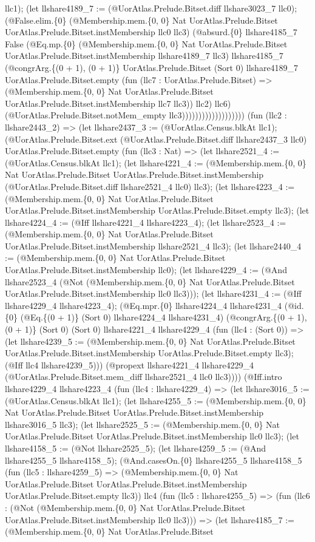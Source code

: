 \documentclass[11pt]{article}
\begin{document}
llc1); (let llshare4189\_7 := (@UorAtlas.Prelude.Bitset.diff llshare3023\_7 llc0); (@False.elim.\{0\} (@Membership.mem.\{0, 0\} Nat UorAtlas.Prelude.Bitset UorAtlas.Prelude.Bitset.instMembership llc0 llc3) (@absurd.\{0\} llshare4185\_7 False (@Eq.mp.\{0\} (@Membership.mem.\{0, 0\} Nat UorAtlas.Prelude.Bitset UorAtlas.Prelude.Bitset.instMembership llshare4189\_7 llc3) llshare4185\_7 (@congrArg.\{(0 + 1), (0 + 1)\} UorAtlas.Prelude.Bitset (Sort 0) llshare4189\_7 UorAtlas.Prelude.Bitset.empty (fun (llc7 : UorAtlas.Prelude.Bitset) => (@Membership.mem.\{0, 0\} Nat UorAtlas.Prelude.Bitset UorAtlas.Prelude.Bitset.instMembership llc7 llc3)) llc2) llc6) (@UorAtlas.Prelude.Bitset.notMem\_empty llc3))))))))))))))))))) (fun (llc2 : llshare2443\_2) => (let llshare2437\_3 := (@UorAtlas.Census.blkAt llc1); (@UorAtlas.Prelude.Bitset.ext (@UorAtlas.Prelude.Bitset.diff llshare2437\_3 llc0) UorAtlas.Prelude.Bitset.empty (fun (llc3 : Nat) => (let llshare2521\_4 := (@UorAtlas.Census.blkAt llc1); (let llshare4221\_4 := (@Membership.mem.\{0, 0\} Nat UorAtlas.Prelude.Bitset UorAtlas.Prelude.Bitset.instMembership (@UorAtlas.Prelude.Bitset.diff llshare2521\_4 llc0) llc3); (let llshare4223\_4 := (@Membership.mem.\{0, 0\} Nat UorAtlas.Prelude.Bitset UorAtlas.Prelude.Bitset.instMembership UorAtlas.Prelude.Bitset.empty llc3); (let llshare4224\_4 := (@Iff llshare4221\_4 llshare4223\_4); (let llshare2523\_4 := (@Membership.mem.\{0, 0\} Nat UorAtlas.Prelude.Bitset UorAtlas.Prelude.Bitset.instMembership llshare2521\_4 llc3); (let llshare2440\_4 := (@Membership.mem.\{0, 0\} Nat UorAtlas.Prelude.Bitset UorAtlas.Prelude.Bitset.instMembership llc0); (let llshare4229\_4 := (@And llshare2523\_4 (@Not (@Membership.mem.\{0, 0\} Nat UorAtlas.Prelude.Bitset UorAtlas.Prelude.Bitset.instMembership llc0 llc3))); (let llshare4231\_4 := (@Iff llshare4229\_4 llshare4223\_4); (@Eq.mpr.\{0\} llshare4224\_4 llshare4231\_4 (@id.\{0\} (@Eq.\{(0 + 1)\} (Sort 0) llshare4224\_4 llshare4231\_4) (@congrArg.\{(0 + 1), (0 + 1)\} (Sort 0) (Sort 0) llshare4221\_4 llshare4229\_4 (fun (llc4 : (Sort 0)) => (let llshare4239\_5 := (@Membership.mem.\{0, 0\} Nat UorAtlas.Prelude.Bitset UorAtlas.Prelude.Bitset.instMembership UorAtlas.Prelude.Bitset.empty llc3); (@Iff llc4 llshare4239\_5))) (@propext llshare4221\_4 llshare4229\_4 (@UorAtlas.Prelude.Bitset.mem\_diff llshare2521\_4 llc0 llc3)))) (@Iff.intro llshare4229\_4 llshare4223\_4 (fun (llc4 : llshare4229\_4) => (let llshare3016\_5 := (@UorAtlas.Census.blkAt llc1); (let llshare4255\_5 := (@Membership.mem.\{0, 0\} Nat UorAtlas.Prelude.Bitset UorAtlas.Prelude.Bitset.instMembership llshare3016\_5 llc3); (let llshare2525\_5 := (@Membership.mem.\{0, 0\} Nat UorAtlas.Prelude.Bitset UorAtlas.Prelude.Bitset.instMembership llc0 llc3); (let llshare4158\_5 := (@Not llshare2525\_5); (let llshare4259\_5 := (@And llshare4255\_5 llshare4158\_5); (@And.casesOn.\{0\} llshare4255\_5 llshare4158\_5 (fun (llc5 : llshare4259\_5) => (@Membership.mem.\{0, 0\} Nat UorAtlas.Prelude.Bitset UorAtlas.Prelude.Bitset.instMembership UorAtlas.Prelude.Bitset.empty llc3)) llc4 (fun (llc5 : llshare4255\_5) => (fun (llc6 : (@Not (@Membership.mem.\{0, 0\} Nat UorAtlas.Prelude.Bitset UorAtlas.Prelude.Bitset.instMembership llc0 llc3))) => (let llshare4185\_7 := (@Membership.mem.\{0, 0\} Nat UorAtlas.Prelude.Bitset 
\end{document}
